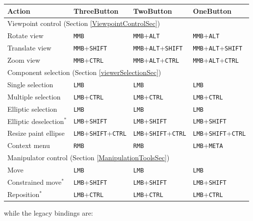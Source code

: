 \documentclass{article}
\begin{document}
\begin{center}
\begin{tabular}{|l|l|l|l|}
\hline
Action & {\sf ThreeButton} & {\sf TwoButton} & {\sf OneButton}\\
\hline
\hline
\multicolumn{4}{|l|}{Viewpoint control (Section \ref{ViewpointControlSec})}\\
\hline
Rotate view & 
{\tt MMB} & {\tt MMB}+{\tt ALT} & {\tt MMB}+{\tt ALT}\\
Translate view & 
{\tt MMB}+{\tt SHIFT} & {\tt MMB}+{\tt ALT}+{\tt SHIFT} & 
{\tt MMB}+{\tt ALT}+{\tt SHIFT}\\
Zoom view & 
{\tt MMB}+{\tt CTRL} & {\tt MMB}+{\tt ALT}+{\tt CTRL} & 
{\tt MMB}+{\tt ALT}+{\tt CTRL}\\
\hline
\multicolumn{4}{|l|}{Component selection (Section \ref{viewerSelectionSec})}\\
\hline
Single selection & 
{\tt LMB} & {\tt LMB} & {\tt LMB}\\
Multiple selection & 
{\tt LMB}+{\tt CTRL} & {\tt LMB}+{\tt CTRL} & {\tt LMB}+{\tt CTRL}\\
Elliptic selection & 
{\tt LMB} & {\tt LMB} & {\tt LMB}\\
Elliptic deselection$^*$ & 
{\tt LMB}+{\tt SHIFT} & {\tt LMB}+{\tt SHIFT} & {\tt LMB}+{\tt SHIFT}\\
Resize paint ellipse & 
{\tt LMB}+{\tt SHIFT}+{\tt CTRL} & {\tt LMB}+{\tt SHIFT}+{\tt CTRL} & 
{\tt LMB}+{\tt SHIFT}+{\tt CTRL}\\
Context menu & 
{\tt RMB} & {\tt RMB} & {\tt LMB}+{\tt META}\\
\hline
\multicolumn{4}{|l|}{Manipulator control (Section \ref{ManipulationToolsSec})}\\
\hline
Move & 
{\tt LMB} & {\tt LMB} & {\tt LMB}\\
Constrained move$^*$ & 
{\tt LMB}+{\tt SHIFT} & {\tt LMB}+{\tt SHIFT} & {\tt LMB}+{\tt SHIFT}\\
Reposition$^*$ & 
{\tt LMB}+{\tt CTRL} & {\tt LMB}+{\tt CTRL} & {\tt LMB}+{\tt CTRL}\\
\hline
\end{tabular}
\end{center}

while the legacy bindings are:
\end{document}
